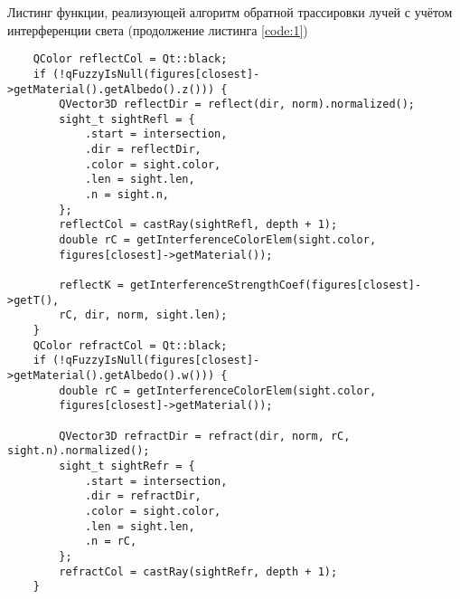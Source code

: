\newpage

\begin{code}
\caption{Листинг функции, реализующей алгоритм обратной трассировки лучей с учётом интерференции света (продолжение листинга \ref{code:1})}
\label{code:2}
\begin{verbatim}
    QColor reflectCol = Qt::black;
    if (!qFuzzyIsNull(figures[closest]->getMaterial().getAlbedo().z())) {
        QVector3D reflectDir = reflect(dir, norm).normalized();
        sight_t sightRefl = {
            .start = intersection,
            .dir = reflectDir,
            .color = sight.color,
            .len = sight.len,
            .n = sight.n,
        };
        reflectCol = castRay(sightRefl, depth + 1);
        double rC = getInterferenceColorElem(sight.color,
        figures[closest]->getMaterial());
        
        reflectK = getInterferenceStrengthCoef(figures[closest]->getT(),
        rC, dir, norm, sight.len);
    }
    QColor refractCol = Qt::black;
    if (!qFuzzyIsNull(figures[closest]->getMaterial().getAlbedo().w())) {
        double rC = getInterferenceColorElem(sight.color,
        figures[closest]->getMaterial());

        QVector3D refractDir = refract(dir, norm, rC, sight.n).normalized();
        sight_t sightRefr = {
            .start = intersection,
            .dir = refractDir,
            .color = sight.color,
            .len = sight.len,
            .n = rC,
        };
        refractCol = castRay(sightRefr, depth + 1);
    }
\end{verbatim}
\end{code}

